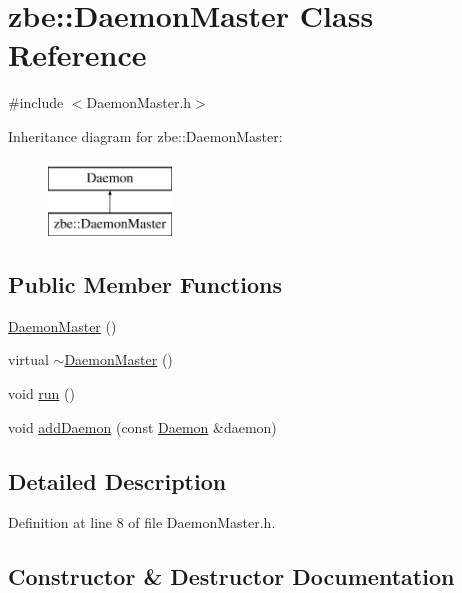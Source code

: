 \hypertarget{classzbe_1_1_daemon_master}{}\section{zbe\+:\+:Daemon\+Master Class Reference}
\label{classzbe_1_1_daemon_master}


{\ttfamily \#include $<$Daemon\+Master.\+h$>$}

Inheritance diagram for zbe\+:\+:Daemon\+Master\+:\begin{figure}[H]
\begin{center}
\leavevmode
\includegraphics[height=2.000000cm]{classzbe_1_1_daemon_master}
\end{center}
\end{figure}
\subsection*{Public Member Functions}
\begin{DoxyCompactItemize}
\item 
\hyperlink{classzbe_1_1_daemon_master_abe49e03031bc2a94f5285b553cccb2dc}{Daemon\+Master} ()
\item 
virtual \hyperlink{classzbe_1_1_daemon_master_a2751a69806fd5db755f9cfb102249f7d}{$\sim$\+Daemon\+Master} ()
\item 
void \hyperlink{classzbe_1_1_daemon_master_a8e6876eb4587400f2134e5d9c7e39b73}{run} ()
\item 
void \hyperlink{classzbe_1_1_daemon_master_aa4aeee38aa6859013f7c6f5068ff1037}{add\+Daemon} (const \hyperlink{class_daemon}{Daemon} \&daemon)
\end{DoxyCompactItemize}


\subsection{Detailed Description}


Definition at line 8 of file Daemon\+Master.\+h.



\subsection{Constructor \& Destructor Documentation}
\hypertarget{classzbe_1_1_daemon_master_abe49e03031bc2a94f5285b553cccb2dc}{}
